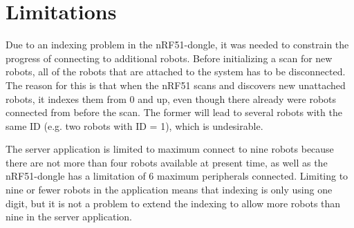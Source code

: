 \section{Limitations}
Due to an indexing problem in the nRF51-dongle, it was needed to constrain the progress of connecting to additional robots. Before initializing a scan for new robots, all of the robots that are attached to the system has to be disconnected. The reason for this is that when the nRF51 scans and discovers new unattached robots, it indexes them from 0 and up, even though there already were robots connected from before the scan. The former will lead to several robots with the same ID (e.g. two robots with ID = 1), which is undesirable.

The server application is limited to maximum connect to nine robots because there are not more than four robots available at present time, as well as the nRF51-dongle has a limitation of 6 maximum peripherals connected. Limiting to nine or fewer robots in the application means that indexing is only using one digit, but it is not a problem to extend the indexing to allow more robots than nine in the server application.